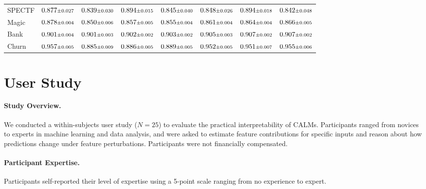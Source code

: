 \begin{table}[htbp]
{\begin{tabular}{lccccccc}
SPECTF & $0.877 \text{\scriptsize$\pm$0.027}$ & $0.839 \text{\scriptsize$\pm$0.030}$ & $0.894 \text{\scriptsize$\pm$0.015}$ & $0.845 \text{\scriptsize$\pm$0.040}$ & $0.848 \text{\scriptsize$\pm$0.026}$ & $0.894 \text{\scriptsize$\pm$0.018}$ & $0.842 \text{\scriptsize$\pm$0.048}$ \\
Magic & $0.878 \text{\scriptsize$\pm$0.004}$ & $0.850 \text{\scriptsize$\pm$0.006}$ & $0.857 \text{\scriptsize$\pm$0.005}$ & $0.855 \text{\scriptsize$\pm$0.004}$ & $0.861 \text{\scriptsize$\pm$0.004}$ & $0.864 \text{\scriptsize$\pm$0.004}$ & $0.866 \text{\scriptsize$\pm$0.005}$ \\
Bank & $0.901 \text{\scriptsize$\pm$0.004}$ & $0.901 \text{\scriptsize$\pm$0.003}$ & $0.902 \text{\scriptsize$\pm$0.002}$ & $0.903 \text{\scriptsize$\pm$0.002}$ & $0.905 \text{\scriptsize$\pm$0.003}$ & $0.907 \text{\scriptsize$\pm$0.002}$ & $0.907 \text{\scriptsize$\pm$0.002}$ \\
Churn & $0.957 \text{\scriptsize$\pm$0.005}$ & $0.885 \text{\scriptsize$\pm$0.009}$ & $0.886 \text{\scriptsize$\pm$0.005}$ & $0.889 \text{\scriptsize$\pm$0.005}$ & $0.952 \text{\scriptsize$\pm$0.005}$ & $0.951 \text{\scriptsize$\pm$0.007}$ & $0.955 \text{\scriptsize$\pm$0.006}$ \\
\bottomrule
\end{tabular}
}
\end{table}

\newpage

\section{User Study}\label{app:user-study}

\paragraph{Study Overview.}
We conducted a within-subjects user study ($N=25$) to evaluate the practical interpretability of CALMs. Participants ranged from novices to experts in machine learning and data analysis, and were asked to estimate feature contributions for specific inputs and reason about how predictions change under feature perturbations. Participants were not financially compensated.

\paragraph{Participant Expertise.}
Participants self-reported their level of expertise using a 5-point scale ranging from no experience to expert.


